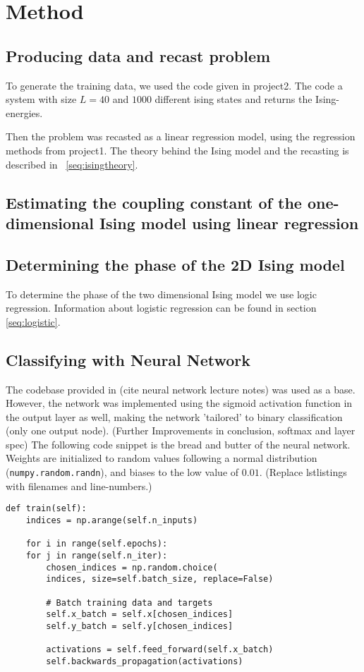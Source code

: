\section{Method}

\subsection{Producing data and recast problem}
To generate the training data, we used the code given in 
project2. 
The code a system with size \(L=40\) and \(1000\) different 
ising states and returns the Ising-energies. 

Then the problem was recasted as a linear regression model, using 
the regression methods from project1. The theory behind 
the Ising model and the recasting is described in ~\ref{seq:isingtheory}.

\subsection{Estimating the coupling constant of the one-dimensional Ising model using linear regression}

\subsection{Determining the phase of the 2D Ising model}
To determine the phase of the two dimensional Ising model we use 
logic regression. Information about logistic regression can be found 
in section \ref{seq:logistic}.

\subsection{Classifying with Neural Network}
The codebase provided in (cite neural network lecture notes) was
used as a base. However, the network was implemented using the sigmoid
activation function in the output layer as well, making the network
'tailored' to binary classification (only one output node). 
(Further Improvements in conclusion, softmax and layer spec)
The following code snippet is the bread and butter of the neural
network. Weights are initialized to random values following a
normal distribution (\lstinline{numpy.random.randn}), and biases
to the low value of $0.01$.
(Replace lstlistings with filenames and line-numbers.)
\begin{lstlisting}
def train(self):
    indices = np.arange(self.n_inputs)

    for i in range(self.epochs):
	for j in range(self.n_iter):
	    chosen_indices = np.random.choice(
		indices, size=self.batch_size, replace=False)

	    # Batch training data and targets
	    self.x_batch = self.x[chosen_indices]
	    self.y_batch = self.y[chosen_indices]

	    activations = self.feed_forward(self.x_batch)
	    self.backwards_propagation(activations)
\end{lstlisting}
